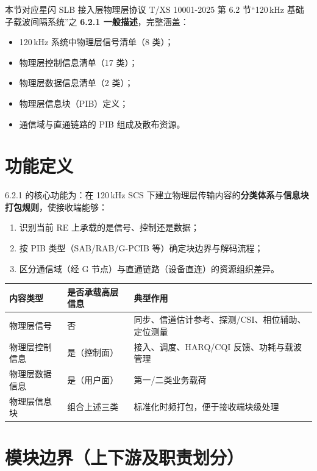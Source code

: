 \documentclass[11pt,a4paper]{ctexart}
\begin{document}
本节对应星闪 SLB 接入层物理层协议 T/XS 10001-2025 第 6.2 节``120\,kHz 基础子载波间隔系统''之 \textbf{6.2.1 一般描述}，完整涵盖：
\begin{itemize}[nosep]
  \item 120\,kHz 系统中物理层信号清单（8 类）；
  \item 物理层控制信息清单（17 类）；
  \item 物理层数据信息清单（2 类）；
  \item 物理层信息块（PIB）定义；
  \item 通信域与直通链路的 PIB 组成及散布资源。
\end{itemize}

\section{功能定义}

6.2.1 的核心功能为：在 120\,kHz SCS 下建立物理层传输内容的\textbf{分类体系}与\textbf{信息块打包规则}，使接收端能够：
\begin{enumerate}[nosep]
  \item 识别当前 RE 上承载的是信号、控制还是数据；
  \item 按 PIB 类型（SAB/RAB/G-PCIB 等）确定块边界与解码流程；
  \item 区分通信域（经 G 节点）与直通链路（设备直连）的资源组织差异。
\end{enumerate}

\begin{table}[h]
\centering
\small
\begin{tabular}{p{3.5cm}p{4cm}p{6cm}}
\toprule
\textbf{内容类型} & \textbf{是否承载高层信息} & \textbf{典型作用} \\
\midrule
物理层信号 & 否 & 同步、信道估计参考、探测/CSI、相位辅助、定位测量 \\
物理层控制信息 & 是（控制面） & 接入、调度、HARQ/CQI 反馈、功耗与载波管理 \\
物理层数据信息 & 是（用户面） & 第一/二类业务载荷 \\
物理层信息块 & 组合上述三类 & 标准化时频打包，便于接收端块级处理 \\
\bottomrule
\end{tabular}
\end{table}

\section{模块边界（上下游及职责划分）}
\end{document}
